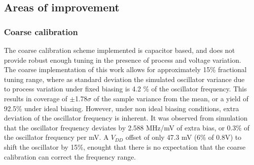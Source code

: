 


\FloatBarrier

\subsection{Areas of improvement}
	\subsubsection{Coarse calibration}
	The coarse calibration scheme implemented is capacitor based, and does not provide robust enough tuning in the presence of process and voltage variation. The coarse implementation of this work allows for approximately 15\% fractional tuning range, where as standard deviation the simulated oscillator variance due to process variation under fixed biasing is 4.2 \% of the oscillator frequency. This results in coverage of $\pm$1.78$\sigma$ of the sample variance from the mean, or a yield of 92.5\% under ideal biasing. However, under non ideal biasing conditions, extra deviation of the oscillator frequency is inherent. It was observed from simulation that the oscillator frequency deviates by 2.588 MHz/mV of extra bias, or 0.3\% of the oscillator frequency per mV. A $V_{DD}$ offset of only 47.3 mV (6\% of 0.8V) to shift the oscillator by 15\%, enought that there is no expectation that the coarse calibration can correct the frequency range. 

